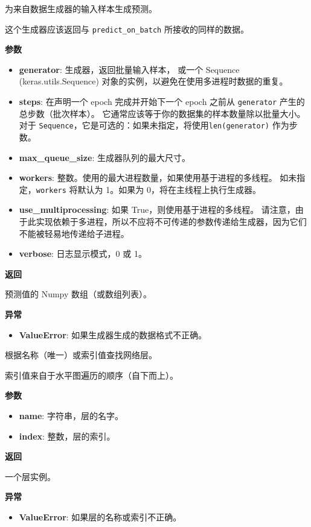 为来自数据生成器的输入样本生成预测。

这个生成器应该返回与 \texttt{predict\_on\_batch} 所接收的同样的数据。

\textbf{参数}

\begin{itemize}
\item
  \textbf{generator}: 生成器，返回批量输入样本， 或一个 Sequence
  (keras.utils.Sequence) 对象的实例，以避免在使用多进程时数据的重复。
\item
  \textbf{steps}: 在声明一个 epoch 完成并开始下一个 epoch 之前从
  \texttt{generator} 产生的总步数（批次样本）。
  它通常应该等于你的数据集的样本数量除以批量大小。 对于
  \texttt{Sequence}，它是可选的：如果未指定，将使用\texttt{len(generator)}
  作为步数。
\item
  \textbf{max\_queue\_size}: 生成器队列的最大尺寸。
\item
  \textbf{workers}: 整数。使用的最大进程数量，如果使用基于进程的多线程。
  如未指定，\texttt{workers} 将默认为 1。如果为
  0，将在主线程上执行生成器。
\item
  \textbf{use\_multiprocessing}: 如果 True，则使用基于进程的多线程。
  请注意，由于此实现依赖于多进程，所以不应将不可传递的参数传递给生成器，因为它们不能被轻易地传递给子进程。
\item
  \textbf{verbose}: 日志显示模式，0 或 1。
\end{itemize}

\textbf{返回}

预测值的 Numpy 数组（或数组列表）。

\textbf{异常}

\begin{itemize}
\tightlist
\item
  \textbf{ValueError}: 如果生成器生成的数据格式不正确。
\end{itemize}



\label{getux5flayer}

\begin{Shaded}
\begin{Highlighting}[]
\OperatorTok{=}\OperatorTok{=}\NormalTok{)}
\end{Highlighting}
\end{Shaded}

根据名称（唯一）或索引值查找网络层。

索引值来自于水平图遍历的顺序（自下而上）。

\textbf{参数}

\begin{itemize}
\tightlist
\item
  \textbf{name}: 字符串，层的名字。
\item
  \textbf{index}: 整数，层的索引。
\end{itemize}

\textbf{返回}

一个层实例。

\textbf{异常}

\begin{itemize}
\tightlist
\item
  \textbf{ValueError}: 如果层的名称或索引不正确。
\end{itemize}
\newpage
